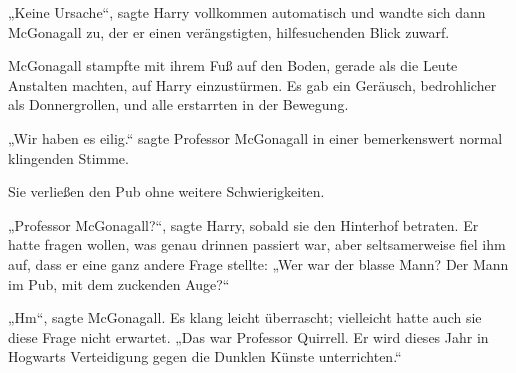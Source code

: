 „Keine Ursache“, sagte Harry vollkommen automatisch und wandte sich dann McGonagall zu, der er einen verängstigten, hilfesuchenden Blick zuwarf.

McGonagall stampfte mit ihrem Fuß auf den Boden, gerade als die Leute Anstalten machten, auf Harry einzustürmen. Es gab ein Geräusch, bedrohlicher als Donnergrollen, und alle erstarrten in der Bewegung.

„Wir haben es eilig.“ sagte Professor McGonagall in einer bemerkenswert normal klingenden Stimme.

Sie verließen den Pub ohne weitere Schwierigkeiten.

„Professor McGonagall?“, sagte Harry, sobald sie den Hinterhof betraten. Er hatte fragen wollen, was genau drinnen passiert war, aber seltsamerweise fiel ihm auf, dass er eine ganz andere Frage stellte: „Wer war der blasse Mann? Der Mann im Pub, mit dem zuckenden Auge?“

„Hm“, sagte McGonagall. Es klang leicht überrascht; vielleicht hatte auch sie diese Frage nicht erwartet. „Das war Professor Quirrell. Er wird dieses Jahr in Hogwarts Verteidigung gegen die Dunklen Künste unterrichten.“


